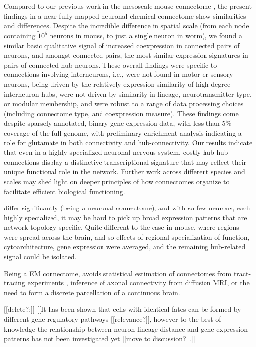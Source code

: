 \documentclass[10pt,letterpaper]{article}
\begin{document}
Compared to our previous work in the mesoscale mouse connectome \cite{Fulcher:2016ck}, the present findings in a near-fully mapped neuronal chemical connectome show similarities and differences.
Despite the incredible difference in spatial scale (from each node containing $\tilde 10^5$ neurons in mouse, to just a single neuron in worm), we found a similar basic qualitative signal of increased coexpression in connected pairs of neurons, and amongst connected pairs, the most similar expression signatures in pairs of connected hub neurons.
These overall findings were specific to connections involving interneurons, i.e., were not found in motor or sensory neurons, being driven by the relatively expression similarity of high-degree interneuron hubs, were not driven by similarity in lineage, neurotransmitter type, or modular membership, and were robust to a range of data processing choices (including connectome type, and coexpression measure).
These findings come despite sparsely annotated, binary gene expression data, with less than 5\% coverage of the full genome, with preliminary enrichment analysis indicating a role for glutamate in both connectivity and hub-connectivity.
Our results indicate that even in a highly specialized neuronal nervous system, costly hub-hub connections display a distinctive transcriptional signature that may reflect their unique functional role in the network.
Further work across different species and scales may shed light on deeper principles of how connectomes organize to facilitate efficient biological functioning.


differ significantly (being a neuronal connectome), and with so few neurons, each highly specialized, it may be hard to pick up broad expression patterns that are network topology-specific.
Quite different to the case in mouse, where regions were spread across the brain, and so effects of regional specialization of function, cytoarchitecture, gene expression were averaged, and the remaining hub-related signal could be isolated.


Being a EM connectome, avoids statistical estimation of connectomes from tract-tracing experiments \cite{Ypma:2016em}, inference of axonal connectivity from diffusion MRI, or the need to form a discrete parcellation of a continuous brain.

[[delete?:]]
[[It has been shown that cells with identical fates can be formed by different gene regulatory pathways \cite{Liu2009} [[relevance?]], however to the best of knowledge the relationship between neuron lineage distance and gene expression patterns has not been investigated yet [[move to discussion?]].]]
\end{document}
